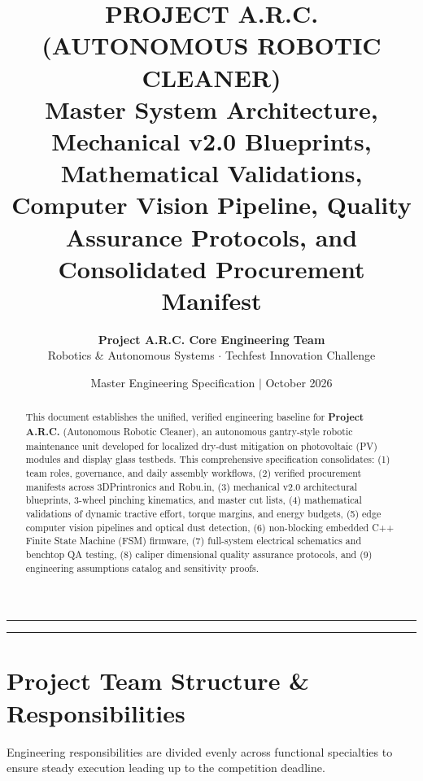 \documentclass[10pt,a4paper]{article}
\title{\textbf{PROJECT A.R.C. (AUTONOMOUS ROBOTIC CLEANER)}\\\Large Master System Architecture, Mechanical v2.0 Blueprints, Mathematical Validations, Computer Vision Pipeline, Quality Assurance Protocols, and Consolidated Procurement Manifest}
\author{
    \textbf{Project A.R.C. Core Engineering Team} \\[0.5em]
    \small Robotics \& Autonomous Systems $\cdot$ Techfest Innovation Challenge
}
\date{Master Engineering Specification $\mid$ October 2026}
\begin{document}
\maketitle
\thispagestyle{fancy}

\begin{abstract}
This document establishes the unified, verified engineering baseline for \textbf{Project A.R.C.} (Autonomous Robotic Cleaner), an autonomous gantry-style robotic maintenance unit developed for localized dry-dust mitigation on photovoltaic (PV) modules and display glass testbeds. This comprehensive specification consolidates: (1) team roles, governance, and daily assembly workflows, (2) verified procurement manifests across 3DPrintronics and Robu.in, (3) mechanical v2.0 architectural blueprints, 3-wheel pinching kinematics, and master cut lists, (4) mathematical validations of dynamic tractive effort, torque margins, and energy budgets, (5) edge computer vision pipelines and optical dust detection, (6) non-blocking embedded C++ Finite State Machine (FSM) firmware, (7) full-system electrical schematics and benchtop QA testing, (8) caliper dimensional quality assurance protocols, and (9) engineering assumptions catalog and sensitivity proofs.
\end{abstract}

\vspace{0.5em}
\hrule
\vspace{0.8em}

\tableofcontents

\vspace{1.0em}
\hrule
\clearpage

\section{Project Team Structure \& Responsibilities}

Engineering responsibilities are divided evenly across functional specialties to ensure steady execution leading up to the competition deadline.
\end{document}
